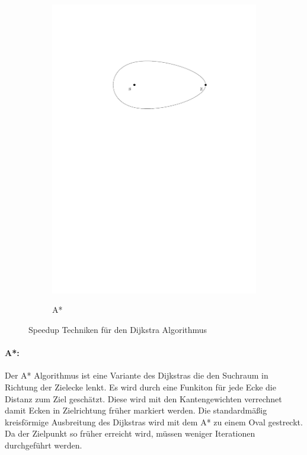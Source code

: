 \documentclass[12pt,a4paper]{article}
\begin{document}
\begin{figure}[h]
\begin{subfigure}{0.30\textwidth}
\includegraphics[width = \textwidth]{../media/stardijkstra.pdf} \\
\vspace{0.9cm}
\caption{A*}
\label{fig:starD}
\end{subfigure}
\caption{Speedup Techniken für den Dijkstra Algorithmus}
\label{speedup}
\end{figure}


\paragraph*{A*:}
Der A* Algorithmus ist eine Variante des Dijkstras die den Suchraum in Richtung der Zielecke lenkt. Es wird durch eine Funkiton für jede Ecke die Distanz zum Ziel geschätzt. Diese wird mit den Kantengewichten verrechnet damit Ecken in Zielrichtung früher markiert werden. Die standardmäßig kreisförmige Ausbreitung des Dijkstras wird mit dem A* zu einem Oval gestreckt. Da der Zielpunkt so früher erreicht wird, müssen weniger Iterationen durchgeführt werden.
\end{document}
